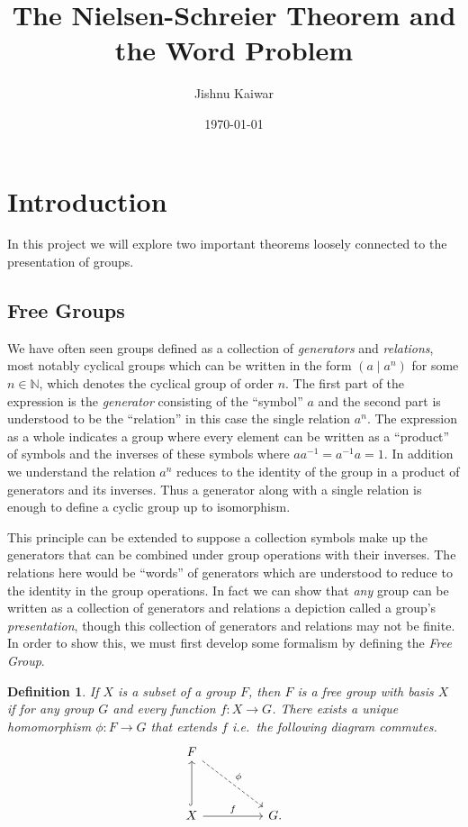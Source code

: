\documentclass[12pt]{article}
\title{The Nielsen-Schreier Theorem and the Word Problem}
\author{Jishnu Kaiwar}
\date{\today}
\newtheorem{definition}{Definition}
\theoremstyle{definition}
\numberwithin{equation}{theorem}
\begin{document}
\maketitle

\tableofcontents

\section{Introduction}
In this project we will explore two important theorems loosely connected to the presentation of groups.

\subsection{Free Groups}
\label{sec:sc:fg}

We have often seen groups defined as a collection of \emph{generators} and \emph{relations}, most notably cyclical groups which can be written in the form $(a \mid a^n)$ for some $n \in \mathbb{N}$, which denotes the cyclical group of order $n$. The first part of the expression is the \emph{generator} consisting of the ``symbol'' $a$ and the second part is understood to be the ``relation'' in this case the single relation $a^n$. The expression as a whole indicates a group where every element can be written as a ``product'' of symbols and the inverses of these symbols where $aa^{-1} = a^{-1}a = 1$. In addition we understand the relation $a^n$ reduces to the identity of the group in a product of generators and its inverses. Thus a generator along with a single relation is enough to define a cyclic group up to isomorphism.

This principle can be extended to suppose a collection symbols make up the generators that can be combined under group operations with their inverses. The relations here would be ``words'' of generators which are understood to reduce to the identity in the group operations. In fact we can show that \emph{any} group can be written as a collection of generators and relations a depiction called a group's \emph{presentation}, though this collection of generators and relations may not be finite. In order to show this, we must first develop some formalism by defining the \emph{Free Group}.

\begin{definition}
  If $X$ is a subset of a group $F$, then $F$ is a \emph{free group} with \emph{basis} $X$ if for any group $G$ and every function $f:X \rightarrow G$. There exists a unique homomorphism $\phi:F \rightarrow G$ that extends $f$ i.e.\ the following diagram commutes.
  \begin{equation}
    \begin{tikzcd}[ampersand replacement=\&, sep=huge]
      F \arrow[dr,dashrightarrow,"\phi"] \\
      X \arrow[u,hook] \arrow[r,"f"] \& G.
    \end{tikzcd}
  \end{equation}
\end{definition}
\end{document}
